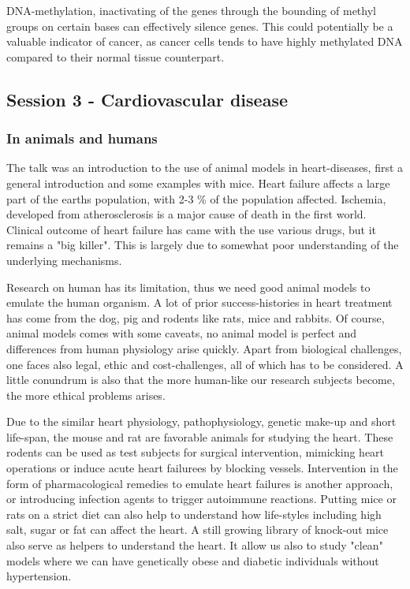 \documentclass[12p]{article}
\begin{document}
DNA-methylation, inactivating of the genes through the bounding of methyl groups on certain bases can effectively silence genes.
This could potentially be a valuable indicator of cancer, as cancer cells tends to have highly methylated DNA compared to their normal tissue counterpart.

\subsection*{Session 3 - Cardiovascular disease}

\subsubsection*{In animals and humans}

The talk was an introduction to the use of animal models in heart-diseases, first a general introduction and some examples with mice.
Heart failure affects a large part of the earths population, with 2-3 \% of the population affected.
Ischemia, developed from atherosclerosis is a major cause of death in the first world.
Clinical outcome of heart failure has came with the use various drugs, but it remains a "big killer".
This is largely due to somewhat poor understanding of the underlying mechanisms.

Research on human has its limitation, thus we need good animal models to emulate the human organism.
A lot of prior success-histories in heart treatment has come from the dog, pig and rodents like rats, mice and rabbits.
Of course, animal models comes with some caveats, no animal model is perfect and differences from human physiology arise quickly.
Apart from biological challenges, one faces also legal, ethic and cost-challenges, all of which has to be considered.
A little conundrum is also that the more human-like our research subjects become, the more ethical problems arises.

Due to the similar heart physiology, pathophysiology, genetic make-up and short life-span, the mouse and rat are favorable animals for studying the heart.
These rodents can be used as test subjects for surgical intervention, mimicking heart operations or induce acute heart failurees by blocking vessels.
Intervention in the form of pharmacological remedies to emulate heart failures is another approach, or introducing infection agents to trigger autoimmune reactions.
Putting mice or rats on a strict diet can also help to understand how life-styles including high salt, sugar or fat can affect the heart.
A still growing library of knock-out mice also serve as helpers to understand the heart.
It allow us also to study "clean" models where we can have genetically obese and diabetic individuals without hypertension.
\end{document}
